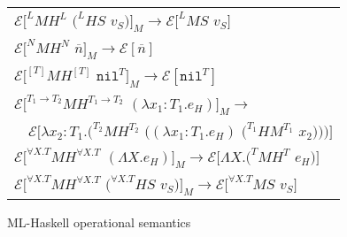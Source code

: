 \begin{figure}[p]
\centering
\begin{tabular}{l}
$\mathscr{E}[^{L}MH^{L}$ $(^{L}HS$ $v_{S})]_{M}\rightarrow\mathscr{E}[^{L}MS$ $v_{S}]$ \\
$\mathscr{E}[^{N}MH^{N}$ $\overline{n}]_{M}\rightarrow\mathscr{E}[\overline{n}]$ \\
$\mathscr{E}[^{[T]}MH^{[T]}$ $\mathtt{nil}^{T}]_{M}\rightarrow\mathscr{E}[\mathtt{nil}^{T}]$ \\
$\mathscr{E}[^{T_{1}\rightarrow T_{2}}MH^{T_{1}\rightarrow T_{2}}$ $(\lambda x_{1}:T_{1}.e_{H})]_{M}\rightarrow$ \\
$\quad\mathscr{E}[\lambda x_{2}:T_{1}.(^{T_{2}}MH^{T_{2}}$ $((\lambda x_{1}:T_{1}.e_{H})$ $(^{T_{1}}HM^{T_{1}}$ $x_{2})))]$ \\
$\mathscr{E}[^{\forall X.T}MH^{\forall X.T}$ $(\Lambda X.e_{H})]_{M}\rightarrow\mathscr{E}[\Lambda X.(^{T}MH^{T}$ $e_{H})]$ \\
$\mathscr{E}[^{\forall X.T}MH^{\forall X.T}$ $(^{\forall X.T}HS$ $v_{S})]_{M}\rightarrow\mathscr{E}[^{\forall X.T}MS$ $v_{S}]$ \\
\end{tabular}
\caption{ML-Haskell operational semantics}
\label{mhos}
\end{figure}